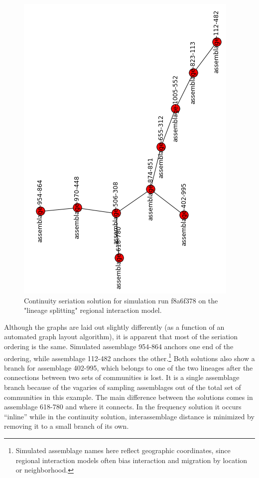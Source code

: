 \begin{figure}[ht]
\centering
\includegraphics[scale=0.4]{graphics/multipleseriation/f8a6f378-cont.png}
\caption{Continuity seriation solution for simulation run f8a6f378 on the "lineage splitting" regional interaction model.}
\label{img:differing-cont}
\end{figure}

Although the graphs are laid out slightly differently (as a function of
an automated graph layout algorithm), it is apparent that most of the
seriation ordering is the same. Simulated assemblage 954-864 anchors one
end of the ordering, while assemblage 112-482 anchors the
other.\footnote{Simulated assemblage names here reflect geographic
  coordinates, since regional interaction models often bias interaction
  and migration by location or neighborhood.} Both solutions also show a
branch for assemblage 402-995, which belongs to one of the two lineages
after the connections between two sets of communities is lost. It is a
single assemblage branch because of the vagaries of sampling assemblages
out of the total set of communities in this example. The main difference
between the solutions comes in assemblage 618-780 and where it connects.
In the frequency solution it occurs ``inline'' while in the continuity
solution, interassemblage distance is minimized by removing it to a
small branch of its own.

